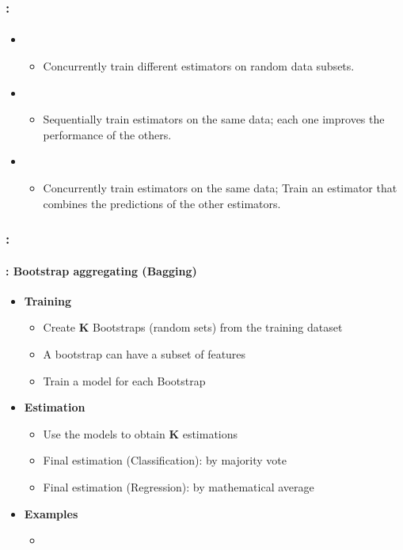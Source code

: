 \documentclass[xcolor=table]{beamer}
\begin{document}
\begin{frame}
	\frametitle{\insertshortsubtitle: \insertsection}
	\framesubtitle{\insertsubsection}
	
	\begin{itemize}
		\item {}
		\begin{itemize}
			\item Concurrently train different estimators on random data subsets.
		\end{itemize}
		\item {}
		\begin{itemize}
			\item Sequentially train estimators on the same data; each one improves the performance of the others.
		\end{itemize}
		\item {}
		\begin{itemize}
			\item Concurrently train estimators on the same data; Train an estimator that combines the predictions of the other estimators.
		\end{itemize}
	\end{itemize}
	
\end{frame}

\begin{frame}
	\frametitle{\insertshortsubtitle: \insertsection}
	\framesubtitle{\insertsubsection: Bootstrap aggregating (Bagging)}
	
	\begin{itemize}
		\item \textbf{Training}
		\begin{itemize}
			\item Create \textbf{K} Bootstraps (random sets) from the training dataset
			\item A bootstrap can have a subset of features
			\item Train a model for each Bootstrap
		\end{itemize}
		\item \textbf{Estimation}
		\begin{itemize}
			\item Use the models to obtain \textbf{K} estimations
			\item Final estimation (Classification): by majority vote
			\item Final estimation (Regression): by mathematical average
		\end{itemize}
		\item \textbf{Examples}
		\begin{itemize}
			\item {}
		\end{itemize}
	\end{itemize}
	
\end{frame}
\end{document}
